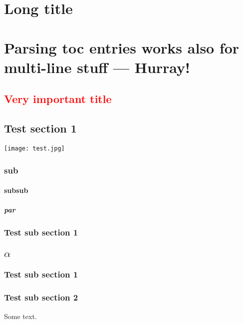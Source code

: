
\chapter[Short title]{Long title}

\chapter{Parsing {toc entries works
  also for} multi-line \texorpdfstring{stuff}{entries}
--- Hurray!}

\section{\texorpdfstring{\textcolor{red}{Very important title}} {Very important title}}
\label{sec:test2}

\section{Test section 1}

\texttt{[image: test.jpg]}

\subsection{sub}

\subsubsection{subsub}

\paragraph{par}

\subsection{Test sub section 1}

\section{$\alpha$}

\subsection{Test sub section 1}

\subsection{Test sub section 2}
Some text.

